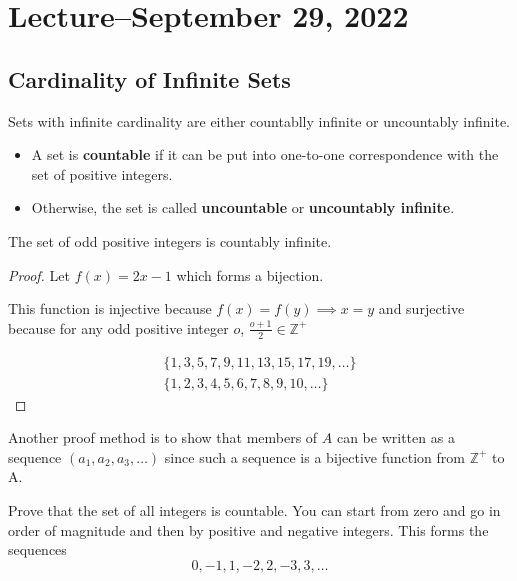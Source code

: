 \section{Lecture--September 29, 2022}

\subsection{Cardinality of Infinite Sets}

Sets with infinite cardinality are either countablly infinite or uncountably infinite.

\begin{itemize}
	\item A set is \textbf{countable} if it can be put into one-to-one correspondence with the set of positive integers.
	\item Otherwise, the set is called \textbf{uncountable} or \textbf{uncountably infinite}.
\end{itemize}

\begin{example}
	The set of odd positive integers is countably infinite.

	\begin{proof}
		Let $f(x)=2x-1$ which forms a bijection.

		This function is injective because $f(x)=f(y)\implies x=y$ and surjective
		because for any odd positive integer $o$, $\frac{o+1}{2}\in \mathbb{Z}^+$

		\begin{align*}
			\{1, 3, 5, 7, 9, 11, 13, 15, 17, 19, \ldots\} \\
			\{1, 2, 3, 4, 5, 6, 7, 8, 9, 10, \ldots\}
		\end{align*}
	\end{proof}
\end{example}

Another proof method is to show that members of $A$ can be written as a sequence
$(a_1, a_2, a_3, \ldots)$ since such a sequence is a bijective function from $\mathbb{Z}^+$ to A.

\begin{example}
	Prove that the set of all integers is countable. You can start from zero and go in order of
	magnitude and then by positive and negative integers. This forms the sequences
	\[0,-1,1,-2,2,-3,3,\ldots\]
\end{example}


